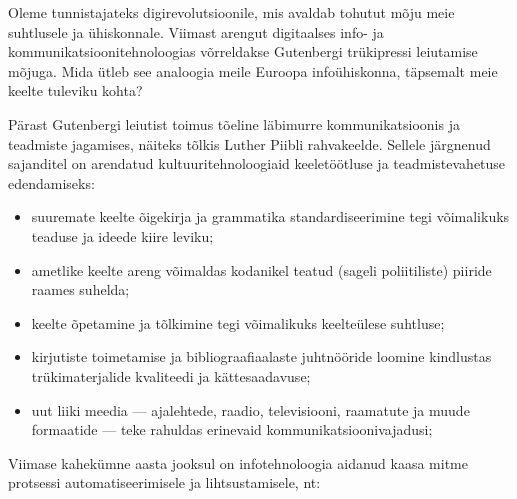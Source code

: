\clearpage



\begin{multicols}{2}

Oleme tunnistajateks digirevolutsioonile, mis avaldab tohutut mõju meie suhtlusele ja ühiskonnale. 
Viimast arengut digitaalses info- ja kommunikatsiooni\-tehno\-loogias võrreldakse Gutenbergi trükipressi leiutamise mõjuga. 
Mida ütleb see ana\-loogia meile Euroopa infoühiskonna, täpsemalt meie keelte tuleviku kohta?


Pärast Gutenbergi leiutist toimus tõeline läbimurre kommunikatsioonis ja teadmiste jagamises, näiteks tõlkis Luther Piib\-li rahvakeelde. 
Sellele järgnenud sajanditel on arendatud kultuuritehnoloogiaid keeletöötluse ja teadmistevahetuse edendamiseks:

\medskip
\begin{itemize}
      \item suuremate keelte õigekirja ja grammatika standardiseerimine tegi võimalikuks teaduse ja ideede kiire leviku;
      \item ametlike keelte areng võimaldas kodanikel teatud (sageli poliitiliste) pii\-ride raames suhelda;
      \item keelte õpetamine ja tõlkimine tegi võimalikuks keelteülese suhtluse;
      \item kirjutiste toimetamise ja bibliograafia\-alaste juhtnööride loomine kindlustas trükimaterjalide kvaliteedi ja kättesaadavuse;
      \item uut liiki meedia --- ajalehtede, raadio, televisiooni, raamatute ja muude formaatide --- teke rahuldas erinevaid kommunikatsiooni\-vajadusi;
\end{itemize}

Viimase kahekümne aasta jooksul on info\-tehnoloogia aidanud kaasa mitme protsessi automatiseerimisele ja lihtsustamisele, nt:


\end{multicols}
